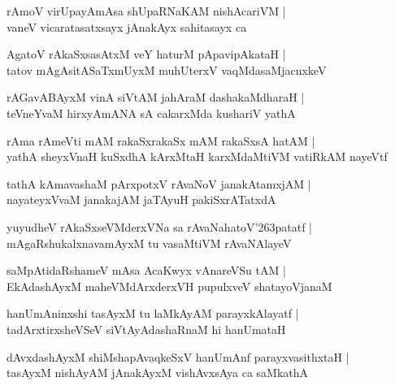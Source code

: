 \documentclass[twoside,12pt,openright]{book}
\def\S{\char'263}
\newcounter{shloka}[chapter]
\begin{document}
\begin{shloka}%
rAmoV virUpayAmAsa shUpaRNaKAM nishAcariVM |\\
vaneV vicaratasatxsayx jAnakAyx sahitasayx ca 
\end{shloka}

\begin{shloka}%
AgatoV rAkaSxsasAtxM veY haturM pApavipAkataH |\\
tatov mAgAsitASaTxmUyxM muhUterxV vaqMdasaMjacnxkeV 
\end{shloka}

\begin{shloka}%
rAGavABAyxM vinA siVtAM jahAraM dashakaMdharaH |\\
teVneYvaM hirxyAmANA sA cakarxMda kushariV yathA 
\end{shloka}

\begin{shloka}%
rAma rAmeVti mAM rakaSxrakaSx mAM rakaSxsA hatAM |\\
yathA sheyxVnaH kuSxdhA kArxMtaH karxMdaMtiVM vatiRkAM nayeVtf
\end{shloka}

\begin{shloka}%
tathA kAmavashaM pArxpotxV rAvaNoV janakAtamxjAM |\\
nayateyxVvaM janakajAM jaTAyuH pakiSxrATatxdA
\end{shloka}

\begin{shloka}%
yuyudheV rAkaSxseVMderxVNa sa rAvaNahatoV\S patatf |\\
mAgaRshukalxnavamAyxM tu vasaMtiVM rAvaNAlayeV 
\end{shloka}

\begin{shloka}%
saMpAtidaRshameV mAsa AcaKwyx vAnareVSu tAM |\\
EkAdashAyxM maheVMdArxderxVH pupulxveV shatayoVjanaM 
\end{shloka}

\begin{shloka}%
hanUmAninxshi tasAyxM tu laMkAyAM parayxkAlayatf |\\
tadArxtirxsheVSeV siVtAyAdashaRnaM hi hanUmataH 
\end{shloka}

\begin{shloka}%
dAvxdashAyxM shiMshapAvaqkeSxV hanUmAnf parayxvasithxtaH |\\
tasAyxM nishAyAM jAnakAyxM vishAvxsAya ca saMkathA 
\end{shloka}
\end{document}
